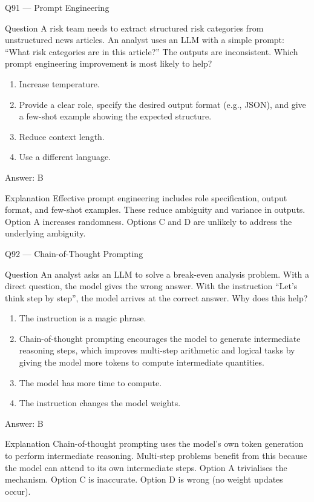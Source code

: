 \documentclass[aspectratio=169,8pt]{beamer}
\begin{document}
\begin{frame}{Q91 --- Prompt Engineering}
\begin{block}{Question}
A risk team needs to extract structured risk categories from unstructured news articles. An analyst uses an LLM with a simple prompt: ``What risk categories are in this article?'' The outputs are inconsistent. Which prompt engineering improvement is most likely to help?
\end{block}
\begin{enumerate}
\item Increase temperature.
\item Provide a clear role, specify the desired output format (e.g., JSON), and give a few-shot example showing the expected structure.
\item Reduce context length.
\item Use a different language.
\end{enumerate}
\begin{exampleblock}{Answer: B}\end{exampleblock}
\begin{block}{Explanation}
Effective prompt engineering includes role specification, output format, and few-shot examples. These reduce ambiguity and variance in outputs. Option A increases randomness. Options C and D are unlikely to address the underlying ambiguity.
\end{block}
\end{frame}

\begin{frame}{Q92 --- Chain-of-Thought Prompting}
\begin{block}{Question}
An analyst asks an LLM to solve a break-even analysis problem. With a direct question, the model gives the wrong answer. With the instruction ``Let's think step by step'', the model arrives at the correct answer. Why does this help?
\end{block}
\begin{enumerate}
\item The instruction is a magic phrase.
\item Chain-of-thought prompting encourages the model to generate intermediate reasoning steps, which improves multi-step arithmetic and logical tasks by giving the model more tokens to compute intermediate quantities.
\item The model has more time to compute.
\item The instruction changes the model weights.
\end{enumerate}
\begin{exampleblock}{Answer: B}\end{exampleblock}
\begin{block}{Explanation}
Chain-of-thought prompting uses the model's own token generation to perform intermediate reasoning. Multi-step problems benefit from this because the model can attend to its own intermediate steps. Option A trivialises the mechanism. Option C is inaccurate. Option D is wrong (no weight updates occur).
\end{block}
\end{frame}
\end{document}
